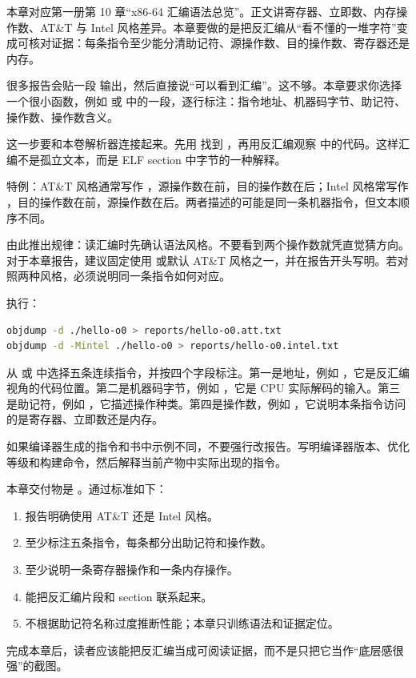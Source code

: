 
本章对应第一册第 10 章“x86-64 汇编语法总览”。正文讲寄存器、立即数、内存操作数、AT\&T 与 Intel 风格差异。本章要做的是把反汇编从“看不懂的一堆字符”变成可核对证据：每条指令至少能分清助记符、源操作数、目的操作数、寄存器还是内存。


很多报告会贴一段  输出，然后直接说“可以看到汇编”。这不够。本章要求你选择一个很小函数，例如  或  中的一段，逐行标注：指令地址、机器码字节、助记符、操作数、操作数含义。

这一步要和本卷解析器连接起来。先用  找到 ，再用反汇编观察  中的代码。这样汇编不是孤立文本，而是 ELF section 中字节的一种解释。


特例：AT\&T 风格通常写作 ，源操作数在前，目的操作数在后；Intel 风格常写作 ，目的操作数在前，源操作数在后。两者描述的可能是同一条机器指令，但文本顺序不同。

由此推出规律：读汇编时先确认语法风格。不要看到两个操作数就凭直觉猜方向。对于本章报告，建议固定使用  或默认 AT\&T 风格之一，并在报告开头写明。若对照两种风格，必须说明同一条指令如何对应。


执行：

\begin{lstlisting}[language=bash]
objdump -d ./hello-o0 > reports/hello-o0.att.txt
objdump -d -Mintel ./hello-o0 > reports/hello-o0.intel.txt
\end{lstlisting}

从  或  中选择五条连续指令，并按四个字段标注。第一是地址，例如 ，它是反汇编视角的代码位置。第二是机器码字节，例如 ，它是 CPU 实际解码的输入。第三是助记符，例如 ，它描述操作种类。第四是操作数，例如 ，它说明本条指令访问的是寄存器、立即数还是内存。

如果编译器生成的指令和书中示例不同，不要强行改报告。写明编译器版本、优化等级和构建命令，然后解释当前产物中实际出现的指令。


本章交付物是 。通过标准如下：

\begin{enumerate}
  \item 报告明确使用 AT\&T 还是 Intel 风格。
  \item 至少标注五条指令，每条都分出助记符和操作数。
  \item 至少说明一条寄存器操作和一条内存操作。
  \item 能把反汇编片段和  section 联系起来。
  \item 不根据助记符名称过度推断性能；本章只训练语法和证据定位。
\end{enumerate}

完成本章后，读者应该能把反汇编当成可阅读证据，而不是只把它当作“底层感很强”的截图。
